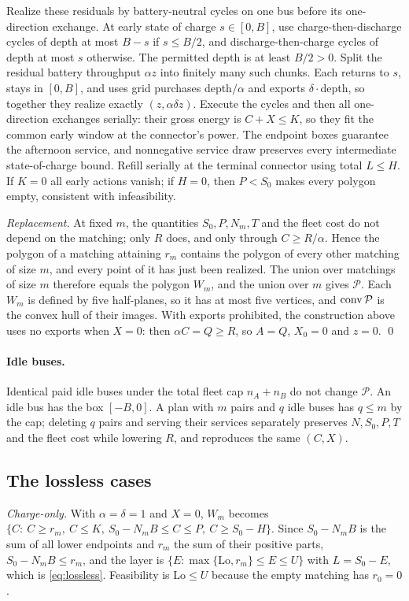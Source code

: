 Realize these residuals by battery-neutral cycles on one bus before its
one-direction exchange. At early state of charge $s\in[0,B]$, use
charge-then-discharge cycles of depth at most $B-s$ if $s\le B/2$, and
discharge-then-charge cycles of depth at most $s$ otherwise. The permitted depth
is at least $B/2>0$. Split the residual battery throughput $\alpha z$ into
finitely many such chunks. Each returns to $s$, stays in $[0,B]$, and uses grid
purchases depth$/\alpha$ and exports $\delta\cdot$depth, so together they
realize exactly $(z,\alpha\delta z)$. Execute the cycles and then all
one-direction exchanges serially: their gross energy is $C+X\le K$, so they fit
the common early window at the connector's power. The endpoint boxes guarantee
the afternoon service, and nonnegative service draw preserves every
intermediate state-of-charge bound. Refill serially at the terminal connector
using total $L\le H$. If $K=0$ all early actions vanish; if $H=0$, then $P<S_0$
makes every polygon empty, consistent with infeasibility.

\emph{Replacement.} At fixed $m$, the quantities $S_0,P,N_m,T$ and the fleet cost
do not depend on the matching; only $R$ does, and only through $C\ge R/\alpha$.
Hence the polygon of a matching attaining $r_m$ contains the polygon of every
other matching of size $m$, and every point of it has just been realized.
The union over matchings of size $m$ therefore equals the polygon $W_m$, and the
union over $m$ gives $\mathcal P$. Each $W_m$ is defined by five half-planes, so
it has at most five vertices, and $\operatorname{conv}\mathcal P$ is the convex hull of their
images. With exports prohibited, the construction above uses no exports when
$X=0$: then $\alpha C=Q\ge R$, so $A=Q$, $X_0=0$ and $z=0$. \qed

\paragraph{Idle buses.} Identical paid idle buses under the total fleet cap
$n_A+n_B$ do not change $\mathcal P$. An idle bus has the box $[-B,0]$. A plan
with $m$ pairs and $q$ idle buses has $q\le m$ by the cap; deleting $q$ pairs
and serving their services separately preserves $N,S_0,P,T$ and the fleet cost
while lowering $R$, and reproduces the same $(C,X)$.

\subsection{The lossless cases}
\emph{Charge-only.} With $\alpha=\delta=1$ and $X=0$, $W_m$ becomes
$\{C:\ C\ge r_m,\ C\le K,\ S_0-N_mB\le C\le P,\ C\ge S_0-H\}$. Since
$S_0-N_mB$ is the sum of all lower endpoints and $r_m$ the sum of their positive
parts, $S_0-N_mB\le r_m$, and the layer is $\{E:\max\{\mathrm{Lo},r_m\}\le E\le U\}$ with
$L=S_0-E$, which is \eqref{eq:lossless}. Feasibility is $\mathrm{Lo}\le U$ because the empty
matching has $r_0=0$.

